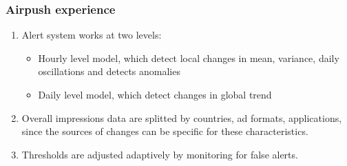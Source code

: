 \documentclass[intlimits, 9pt, unicode]{beamer}
\begin{document}
%
%
%
%
%


\begin{frame}
    \frametitle{Airpush experience}

\begin{enumerate}
  \item Alert system works at two levels:
 \begin{itemize}
	    \item Hourly level model, which detect local changes in mean, variance, daily oscillations and detects anomalies
		\item Daily level model, which detect changes in global trend
\end{itemize}
\bigskip
\item
Overall impressions data are splitted by countries, ad formats, applications,
since the sources of changes can be specific for these characteristics. 
\bigskip
\item
Thresholds are adjusted adaptively by monitoring for false alerts.
\end{enumerate}

\end{frame}
\end{document}
